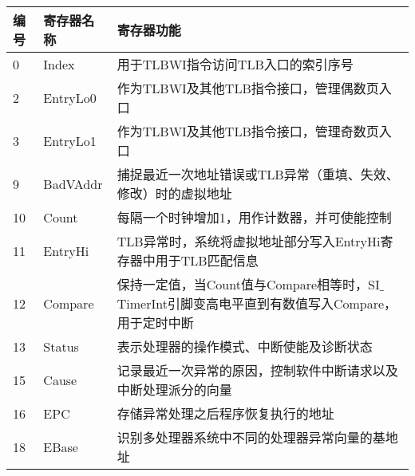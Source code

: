 \begin{table}[H]
\centering
\begin{tabular}{lll}
\hline
编号&寄存器名称&寄存器功能\\
\hline
0&Index&用于TLBWI指令访问TLB入口的索引序号\\
2&EntryLo0&作为TLBWI及其他TLB指令接口，管理偶数页入口\\
3&EntryLo1&作为TLBWI及其他TLB指令接口，管理奇数页入口\\
9&BadVAddr&捕捉最近一次地址错误或TLB异常（重填、失效、修改）时的虚拟地址\\
10&Count&每隔一个时钟增加1，用作计数器，并可使能控制\\
11&EntryHi&TLB异常时，系统将虚拟地址部分写入EntryHi寄存器中用于TLB匹配信息\\
12&Compare&保持一定值，当Count值与Compare相等时，SI$\_$TimerInt引脚变高电平直到有数值写入Compare，用于定时中断\\
13&Status&表示处理器的操作模式、中断使能及诊断状态\\
15&Cause&记录最近一次异常的原因，控制软件中断请求以及中断处理派分的向量\\
16&EPC&存储异常处理之后程序恢复执行的地址\\
18&EBase&识别多处理器系统中不同的处理器异常向量的基地址\\
\hline
\end{tabular}
\end{table}

